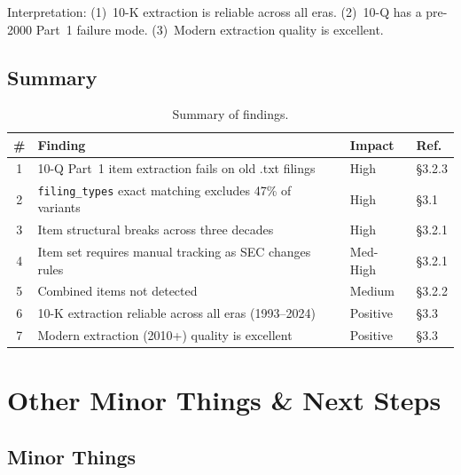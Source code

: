 \documentclass[11pt]{article}
\begin{document}
Interpretation: (1)~10-K extraction is reliable across all eras.
(2)~10-Q has a pre-2000 Part~1 failure mode. (3)~Modern extraction quality is
excellent.

\subsection*{Summary}

\begin{table}[h]
\centering
\begin{tabular}{clll}
\toprule
\# & Finding & Impact & Ref. \\
\midrule
1 & 10-Q Part~1 item extraction fails on old .txt filings & High & \S3.2.3 \\
2 & \texttt{filing\_types} exact matching excludes 47\% of variants & High & \S3.1 \\
3 & Item structural breaks across three decades & High & \S3.2.1 \\
4 & Item set requires manual tracking as SEC changes rules & Med-High & \S3.2.1 \\
5 & Combined items not detected & Medium & \S3.2.2 \\
6 & 10-K extraction reliable across all eras (1993--2024) & Positive & \S3.3 \\
7 & Modern extraction (2010+) quality is excellent & Positive & \S3.3 \\
\bottomrule
\end{tabular}
\caption{Summary of findings.}
\end{table}

\section{Other Minor Things \& Next Steps}

\subsection{Minor Things}
\end{document}
